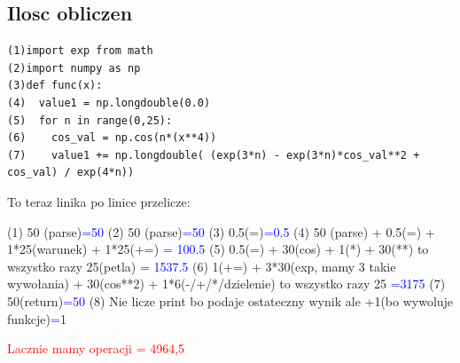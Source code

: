 \documentclass[a4paper,8pt]{article}
\begin{document}
\subsection{Ilosc obliczen}
\begin{lstlisting}
(1)import exp from math
(2)import numpy as np
(3)def func(x):
(4)  value1 = np.longdouble(0.0)
(5)  for n in range(0,25):
(6)    cos_val = np.cos(n*(x**4))
(7)    value1 += np.longdouble( (exp(3*n) - exp(3*n)*cos_val**2 + cos_val) / exp(4*n))
\end{lstlisting}
To teraz linika po linice przelicze:
\begin{flushleft}
(1) 50 (parse)\textcolor{blue}{=50}
\newline
\newline
(2) 50 (parse)\textcolor{blue}{=50}
\newline
\newline
(3) 0.5(=)\textcolor{blue}{=0.5}
\newline
\newline
(4) 50 (parse) + 0.5(=) + 1*25(warunek) + 1*25(+=) \textcolor{blue}{= 100.5}
\newline
\newline
(5) 0.5(=) + 30(cos) + 1(*) + 30(**) to wszystko razy 25(petla) \textcolor{blue}{= 1537.5}
\newline
\newline
(6) 1(+=) + 3*30(exp, mamy 3 takie wywołania) + 30(cos**2) + 1*6(-/+/*/dzielenie) to wszystko razy 25 \textcolor{blue}{=3175}
\newline
\newline
(7) 50(return)\textcolor{blue}{=50}
\newline
\newline
(8) Nie licze print bo podaje ostateczny wynik ale +1(bo wywoluje funkcje)\textcolor{blue}{=1}
\newline
\newline

\textcolor{red}{Lacznie mamy operacji = 4964,5}
\end{flushleft}
\end{document}
